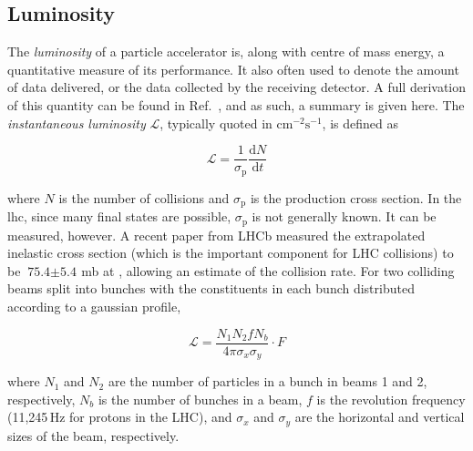



\subsection{Luminosity}
\label{subsec:luminosity}

The \emph{\gls{luminosity}} of a particle accelerator is, along with centre of mass energy, a quantitative measure of its performance. It also often used to denote the amount of data delivered, or the data collected by the receiving detector. A full derivation of this quantity can be found in Ref.~, and as such, a summary is given here. The \emph{instantaneous luminosity} $\mathcal{L}$, typically quoted in $\text{cm}^{-2}\text{s}^{-1}$, is defined as

\begin{equation}
    \mathcal{L} = \frac{1}{\sigma_{\mathrm{p}}} \frac{\mathrm{d}N}{\mathrm{d}t}
    \label{eq:lumi_instantaneous}
\end{equation}

where $N$ is the number of collisions and $\sigma_{\mathrm{p}}$ is the production cross section. In the \acrshort{lhc}, since many final states are possible, $\sigma_{\mathrm{p}}$ is not generally known. It can be measured, however. A recent paper from LHCb measured the extrapolated inelastic cross section (which is the important component for LHC collisions) to be $\text{75.4}\pm\text{5.4}$\,mb at \comruntwo \cite{Aaij:2018okq}, allowing an estimate of the collision rate. For two colliding beams split into bunches with the constituents in each bunch distributed according to a gaussian profile,

\begin{equation}
    \mathcal{L} = \frac{N_1 N_2 f N_b}{4 \pi \sigma_x \sigma_y} \cdot F %
    \label{eq:lumi_inst_head_on_colliding_beams}
\end{equation}

where $N_1$ and $N_2$ are the number of particles in a bunch in beams 1 and 2, respectively, $N_b$ is the number of bunches in a beam, $f$ is the revolution frequency (11,245\,Hz for protons in the LHC), and $\sigma_x$ and $\sigma_y$ are the horizontal and vertical sizes of the beam, respectively.

